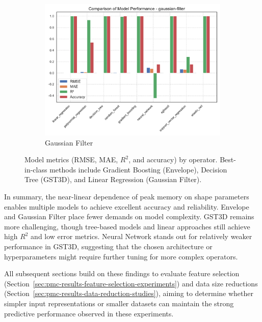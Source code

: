 \begin{figure}[htbp]
\begin{subfigure}[t]{0.32\textwidth}
        \includegraphics[width=\textwidth]{assets/images/05/performance_by_model_gaussian-filter}
        \caption{Gaussian Filter}
    \end{subfigure}
    \caption{Model metrics (\ac{RMSE}, \ac{MAE}, $R^2$, and accuracy) by operator.
        Best-in-class methods include Gradient Boosting (Envelope), Decision Tree (\ac{GST3D}), and Linear Regression (Gaussian Filter).
        \label{fig:performance_by_model_operators}
    }
\end{figure}

In summary, the near-linear dependence of peak memory on shape parameters enables multiple models to achieve excellent accuracy and reliability.
Envelope and Gaussian Filter place fewer demands on model complexity.
\ac{GST3D} remains more challenging, though tree-based models and linear approaches still achieve high $R^2$ and low error metrics.
Neural Network stands out for relatively weaker performance in \ac{GST3D}, suggesting that the chosen architecture or hyperparameters might require further tuning for more complex operators.

All subsequent sections build on these findings to evaluate feature selection (Section~\ref{sec:pmc-results-feature-selection-experiments}) and data size reductions (Section~\ref{sec:pmc-results-data-reduction-studies}), aiming to determine whether simpler input representations or smaller datasets can maintain the strong predictive performance observed in these experiments.